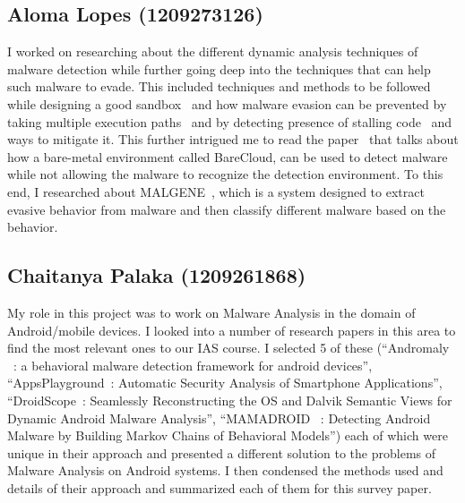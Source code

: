\documentclass[11pt]{article}
\begin{document}
\subsection{Aloma Lopes (1209273126)}
I worked on researching about the different dynamic analysis techniques of malware detection while further going deep into the techniques that can help such malware to evade. This included techniques and methods to be followed while designing a good sandbox~\cite{kruegel2014full} and how malware evasion can be prevented by taking multiple execution paths~\cite{moser2007exploring} and by detecting presence of stalling code~\cite{kolbitsch2011power} and ways to mitigate it. This further intrigued me to read the paper~\cite{kirat2014barecloud} that talks about how a bare-metal environment called BareCloud, can be used to detect malware while not allowing the malware to recognize the detection environment. To this end, I researched about MALGENE~\cite{kirat2015malgene}, which is a system designed to extract evasive behavior from malware and then classify different malware based on the behavior.


\subsection{Chaitanya Palaka (1209261868)}
My role in this project was to work on Malware Analysis in the domain of Android/mobile devices. I looked into a number of research papers in this area to find the most relevant ones to our IAS course. I selected 5 of these (“Andromaly ~\cite{shabtai2012andromaly}: a behavioral malware detection framework for android devices”, “AppsPlayground~\cite{rastogi2013appsplayground}: Automatic Security Analysis of Smartphone Applications”, “DroidScope~\cite{yan2012droidscope}: Seamlessly Reconstructing the OS and Dalvik Semantic Views for Dynamic Android Malware Analysis”, “MAMADROID~\cite{mariconti2016mamadroid} : Detecting Android Malware by Building Markov Chains of Behavioral Models”) each of which were unique in their approach and presented a different solution to the problems of Malware Analysis on Android systems. I then condensed the methods used and details of their approach and summarized each of them for this survey paper.
\end{document}
